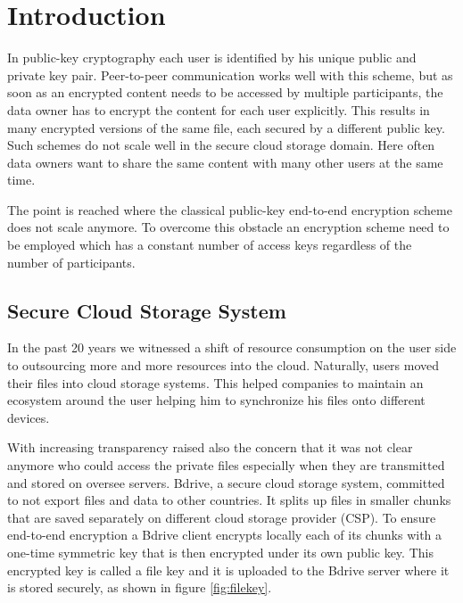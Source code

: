 \chapter{Introduction}
\label{sec:introduction}
In public-key cryptography each user is identified by his unique public and private key pair. Peer-to-peer communication works well with this scheme, but as soon as an encrypted content needs to be accessed by multiple participants, the data owner has to encrypt the content for each user explicitly. This results in many encrypted versions of the same  file, each secured by a different public key. Such schemes do not scale well in the secure cloud storage domain. Here often data owners want to share the same content with many other users at the same time.

The point is reached where the classical public-key end-to-end encryption scheme does not scale anymore. To overcome this obstacle an encryption scheme need to be employed which has a constant number of access keys regardless of the number of participants.

\section{Secure Cloud Storage System}
In the past 20 years we witnessed a shift of resource consumption on the user side to outsourcing more and more resources into the cloud. Naturally, users moved their files into cloud storage systems. This helped companies to maintain an ecosystem around the user helping him to synchronize his files onto different devices.  

With increasing transparency raised also the concern that it was not clear anymore who could access the private files especially when they are transmitted and stored on oversee servers. Bdrive, a secure cloud storage system, committed to not export files and data to other countries. It splits up files in smaller chunks that are saved separately on different cloud storage provider (\ac{CSP}). To ensure end-to-end encryption a Bdrive client encrypts locally each of its chunks with a one-time symmetric key that is then encrypted under its own public key. This encrypted key is called a file key and it is uploaded to the Bdrive server where it is stored securely, as shown in figure \ref{fig:filekey}.

